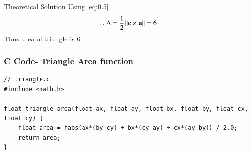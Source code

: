 \documentclass{beamer}
\begin{document}
\begin{frame}{Theoretical Solution}
Using \eqref{eq:0.5}
\begin{align}
	\therefore	\Delta = \frac{1}{2}\left\lVert\mathbf{c}\times\mathbf{a}\right\rVert = 6
\end{align}
Thus area of triangle is $6$\\

	\end{frame}

	\begin{frame}[fragile]
	\frametitle{C Code- Triangle Area function }
	
	\begin{lstlisting}
// triangle.c
#include <math.h>

float triangle_area(float ax, float ay, float bx, float by, float cx, float cy) {
	float area = fabs(ax*(by-cy) + bx*(cy-ay) + cx*(ay-by)) / 2.0;
	return area;
}
	\end{lstlisting}
\end{frame}
\end{document}
